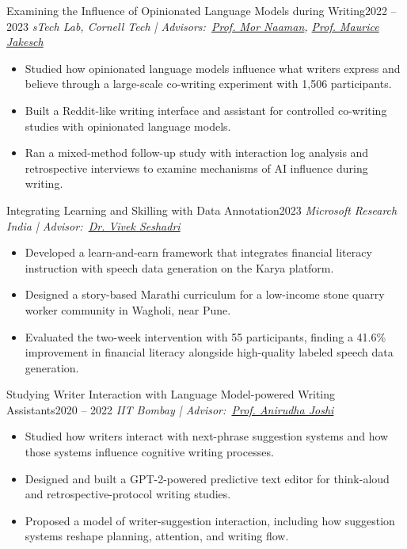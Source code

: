 \begin{projects}

\project
	{Examining the Influence of Opinionated Language Models during Writing}{2022 -- 2023}
	{
	    \textit{sTech Lab, Cornell Tech | Advisors:~\href{https://tech.cornell.edu/people/mor-naaman/}{Prof. Mor Naaman}, \href{https://mauricejakesch.com/}{Prof. Maurice Jakesch}}
	}
	{\begin{itemize}
	\setlength\itemsep{0.3em}
     \item Studied how opinionated language models influence what writers express and believe through a large-scale co-writing experiment with 1,506 participants.
     \item Built a Reddit-like writing interface and assistant for controlled co-writing studies with opinionated language models.
     \item Ran a mixed-method follow-up study with interaction log analysis and retrospective interviews to examine mechanisms of AI influence during writing.
     \end{itemize}}

\project
	{Integrating Learning and Skilling with Data Annotation}{2023}
	{
	     \textit{Microsoft Research India | Advisor:~\href{https://www.microsoft.com/en-us/research/people/visesha/}{Dr. Vivek Seshadri}}
	}
	{\begin{itemize}
	\setlength\itemsep{0.3em}
     \item Developed a learn-and-earn framework that integrates financial literacy instruction with speech data generation on the Karya platform.
     \item Designed a story-based Marathi curriculum for a low-income stone quarry worker community in Wagholi, near Pune.
     \item Evaluated the two-week intervention with 55 participants, finding a 41.6\% improvement in financial literacy alongside high-quality labeled speech data generation.
     \end{itemize}}

\project
    {Studying Writer Interaction with Language Model-powered Writing Assistants}{2020 -- 2022}
		{ \textit{IIT Bombay | Advisor:~\href{http://www.idc.iitb.ac.in/~anirudha/}{Prof. Anirudha Joshi}}}
		{\begin{itemize}
		\setlength\itemsep{0.3em}
     \item Studied how writers interact with next-phrase suggestion systems and how those systems influence cognitive writing processes.
     \item Designed and built a GPT-2-powered predictive text editor for think-aloud and retrospective-protocol writing studies.
     \item Proposed a model of writer-suggestion interaction, including how suggestion systems reshape planning, attention, and writing flow.
     \end{itemize}}


\end{projects}
\vspace{-3mm}

